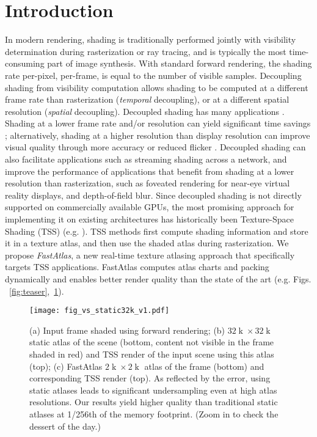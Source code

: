 \section{Introduction}

In modern rendering, shading is traditionally performed jointly with visibility determination during rasterization or ray tracing, and is typically the most time-consuming part of image synthesis.
With standard forward rendering, the shading rate per-pixel, per-frame, is equal to the number of visible samples. Decoupling shading from visibility computation allows shading to be computed at a different frame rate than rasterization ({\em temporal} decoupling), or at a different spatial resolution ({\em spatial} decoupling). 
Decoupled shading has many applications \cite{ragan2011decoupled,baker2012rock,mueller2021tasa,baker:2016,hillesland2016texel,Neff2022MSA,Baker2022,mueller2018shading,hladky2019tessellated,hladky2021snakebinning,Neff2022MSA}.
Shading at a lower frame rate and/or resolution can yield significant time savings \cite{mueller2021tasa}; alternatively, shading at a higher resolution than display resolution can improve visual quality through more accuracy or reduced flicker \cite{baker2012rock,Baker2022}. 
Decoupled shading can also facilitate applications such as streaming shading across a network, and improve the performance of applications that benefit from shading at a lower resolution than rasterization, such as foveated rendering for near-eye virtual reality displays, and depth-of-field blur. 
Since decoupled shading is not directly supported on commercially available GPUs, the most promising approach for implementing it on existing architectures has historically been Texture-Space Shading (TSS) (e.g. \cite{baker:2016,hillesland2016texel,Neff2022MSA,mueller2018shading,Baker2022}). 
TSS methods first compute shading information and store it in a texture atlas, and then use the shaded atlas during rasterization. We propose {\em FastAtlas}, a new real-time texture atlasing approach that specifically targets TSS applications. FastAtlas computes atlas charts and packing dynamically  and enables better render quality than the state of the art (e.g. Figs. ~\ref{fig:teaser},~\ref{fig:static}).

\begin{figure}
\texttt{[image: fig\_vs\_static32k\_v1.pdf]}
\caption{(a) Input frame shaded using forward rendering; (b) $32\operatorname{k} \times 32\operatorname{k}$ static atlas of the scene (bottom, content not visible in the frame shaded in red) and TSS render of the input scene using this atlas (top); (c) FastAtlas $2\operatorname{k} \times 2\operatorname{k}$ atlas of the frame (bottom) and corresponding TSS render (top). As reflected by the \FLIP error, using static atlases leads to significant undersampling even at high atlas resolutions. Our results yield higher quality than traditional static atlases at 1/256th of the memory footprint. (Zoom in to check the dessert of the day.)}
\vspace{-6mm}
\label{fig:static}
\end{figure}

